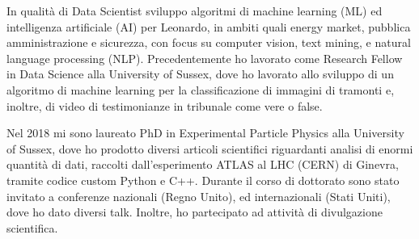 	
In qualità di Data Scientist sviluppo algoritmi di machine learning (ML) ed intelligenza artificiale (AI) per Leonardo, in ambiti quali energy market, pubblica amministrazione e sicurezza, con focus su computer vision, text mining, e natural language processing (NLP). Precedentemente ho lavorato come Research Fellow in Data Science alla University of Sussex, dove ho lavorato allo sviluppo di un algoritmo di machine learning per la classificazione di immagini di tramonti e, inoltre, di video di testimonianze in tribunale come vere o false. 

Nel 2018 mi sono laureato PhD in Experimental Particle Physics alla University of Sussex, dove ho prodotto diversi articoli scientifici riguardanti analisi di enormi quantità di dati, raccolti dall'esperimento ATLAS al LHC (CERN) di Ginevra, tramite codice custom Python e C++. Durante il corso di dottorato sono stato invitato a conferenze nazionali (Regno Unito), ed internazionali (Stati Uniti), dove ho dato diversi talk. Inoltre, ho partecipato ad attività di divulgazione scientifica.